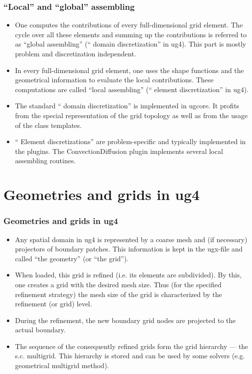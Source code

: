 \documentclass[xcolor=dvipsnames]{beamer}
\begin{document}
\begin {frame} [t]
\frametitle {``Local'' and ``global'' assembling}
\vspace {-2ex}
\begin {itemize}
	\item One computes the contributions of {\color{blue} every full-dimensional grid element}.
		The cycle over all these elements and summing up the contributions is referred to as
		``global assembling'' (``{\color{blue} domain discretization}'' in ug4). This
		part is mostly problem and discretization independent.
	\pause
	\item In every full-dimensional grid element, one uses the shape functions and the
		geometrical information to evaluate the {\color{blue} local contributions}. These computations
		are called ``local assembling'' (``{\color{blue} element discretization}'' in ug4).
	\pause
	\item The standard ``{\color{blue} domain discretization}'' is implemented in {\color{blue} ugcore}.
		It profits from the special representation of the grid topology as well as from
		the usage of the class templates.
	\pause
	\item ``{\color{blue} Element discretizations}'' are problem-specific and typically implemented
		in the {\color{blue} plugins}. The ConvectionDiffusion plugin implements several local assembling
		routines.
\end {itemize}
\end {frame}

\section {Geometries and grids in ug4}

\begin {frame} [t]
\frametitle {Geometries and grids in ug4}
\begin {itemize}
	\item Any spatial domain in ug4 is represented by a {\color{blue} coarse mesh} and (if necessary)
		{\color{blue} projectors} of boundary patches. This information is kept in the ugx-file and
		called {\color{blue} ``the geometry''} (or ``the grid'').
	\pause
	\item When loaded, this grid is {\color{blue} refined} (i.e. its elements are subdivided). By this,
		one creates a grid with the desired mesh size. Thus (for the specified refinement
		strategy) the mesh size of the grid is characterized by the {\color{blue} refinement
		(or grid) level}.
	\pause
	\item During the refinement, the new boundary grid nodes {\color{blue} are projected} to the actual boundary.
	\pause
	\item The sequence of the consequently refined grids form the grid hierarchy --- the s.c.
		{\color{blue} multigrid}. This hierarchy is stored and can be used by some solvers
		(e.g. geometrical multigrid method).
\end {itemize}
\end {frame}
\end{document}
